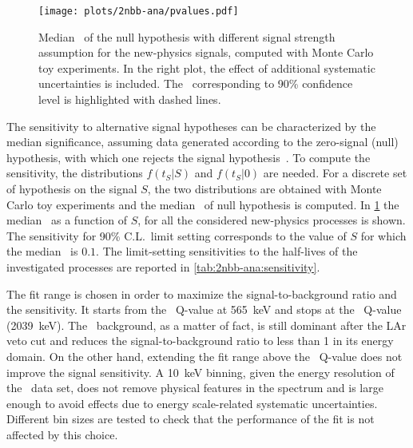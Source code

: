 \begin{figure}
  \centering
  \texttt{[image: plots/2nbb-ana/pvalues.pdf]}
  \caption{%
    Median \pvalue\ of the null hypothesis with different signal strength assumption for
    the new-physics signals, computed with Monte Carlo toy experiments. In the right
    plot, the effect of additional systematic uncertainties is included. The \pvalue\
    corresponding to 90\% confidence level is highlighted with dashed lines. 
  }\label{fig:2nbb-ana:pvalues}
\end{figure}

The sensitivity to alternative signal hypotheses can be characterized by the median
significance, assuming data generated according to the zero-signal (null) hypothesis, with
which one rejects the signal hypothesis~\cite{Cowan2011}. To compute the sensitivity, the
distributions $f(t_S|S)$ and $f(t_S|0)$ are needed. For a discrete set of hypothesis on
the signal $S$, the two distributions are obtained with Monte Carlo toy experiments and
the median \pvalue\ of null hypothesis is computed. In \cref{fig:2nbb-ana:pvalues} the
median \pvalue\ as a function of $S$, for all the considered new-physics processes is
shown. The sensitivity for 90\% C.L.~limit setting corresponds to the value of $S$ for
which the median \pvalue\ is $0.1$. The limit-setting sensitivities to the half-lives of
the investigated processes are reported in \cref{tab:2nbb-ana:sensitivity}.

The fit range is chosen in order to maximize the signal-to-background ratio and the
sensitivity. It starts from the \Arl\ Q-value at 565~keV and stops at the \nnbb\ Q-value
(2039~keV). The \Arl\ background, as a matter of fact, is still dominant after the LAr
veto cut and reduces the signal-to-background ratio to less than 1 in its energy domain.
On the other hand, extending the fit range above the \nnbb\ Q-value does not improve the
signal sensitivity.
\newpar
A 10~keV binning, given the energy resolution of the \enrBEGeII\ data set, does not
remove physical features in the spectrum and is large enough to avoid effects due to
energy scale-related systematic uncertainties. Different bin sizes are tested
to check that the performance of the fit is not affected by this choice.

